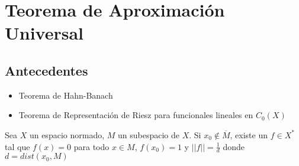 \section{Teorema de Aproximación Universal}

\subsection{Antecedentes}
\begin{frame}
    \begin{itemize}
        \item Teorema de Hahn-Banach
        \item Teorema de Representación de Riesz para funcionales lineales en $C_0(X)$
    \end{itemize}

    \begin{corollary}
    Sea $X$ un espacio normado, $M$ un subespacio de $X$. Si $x_0 \not\in \overline{M}$, existe un $f \in X^*$ tal que $f(x) = 0$ para todo $ x \in M$, $f(x_0) = 1$ y $||f|| = \frac{1}{d}$ donde $d=dist(x_0,M)$
    \end{corollary}
    
\end{frame} 

